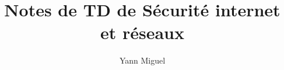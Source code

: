 \documentclass[a4paper, 12pt]{article}
\title{Notes de TD de S\'ecurit\'e internet et r\'eseaux}
\author{Yann Miguel}
\begin{document}
\ttfamily
\maketitle
\tableofcontents
\newpage



\end{document}
